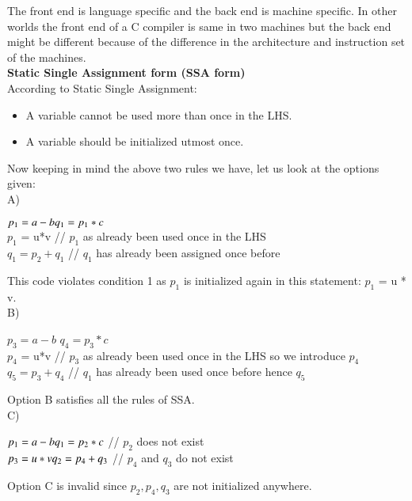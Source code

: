 \documentclass[journal,12pt,twocolumn]{IEEEtran}
\begin{document}
 The front end is language specific and the back end is machine specific. In other worlds the front end of a C compiler is same in two machines but the back end might be different because of the difference in the architecture and instruction set of the machines. \\
 
 \textbf{Static Single Assignment form (SSA form)} \\
According to Static Single Assignment: 
\begin{itemize}
    \item A variable cannot be used more than once in the LHS.
    \item A variable should be initialized utmost once.
\end{itemize}

Now keeping in mind the above two rules we have, let us look at the options given: \\
A) 
\begin{tcolorbox}
$p_{1}  = a - b \\
q_{1}  = p_1*c$ \\
$p_{1}$  = u*v // $p_{1}$ as already been used once in the LHS \\ 
$q_{1}  = p_{2} + q_{1}$ // $q_{1}$ has already been assigned once before \\ 
\end{tcolorbox}
This code violates condition 1 as $p_1$ is initialized again in this statement: $p_1$ = u * v. \\
B)
\begin{tcolorbox}
$p_{3}  = a - b$
$q_{4}  = p_3*c$ \\
$p_{4}$  = u*v // $p_{3}$ as already been used once in the LHS so we introduce $p_4$ \\ 
$q_{5}  = p_{3} + q_{4}$ // $q_{1}$ has already been used once before hence $q_5$\\ 
\end{tcolorbox}
Option B satisfies all the rules of SSA. \\
C)
\begin{tcolorbox}
$p_{1}  = a - b \\
q_{1}  = p_2*c$ // $p_2$ does not exist \\
$p_{3}  = u*v  \\
q_{2}  = p_{4} + q_{3}$ // $p_4$ and $q_3$ do not exist\\
\end{tcolorbox}
Option C is invalid since $p_2,p_4,q_3$ are not initialized anywhere. \\
\end{document}
